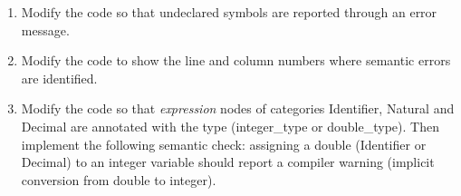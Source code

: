 \begin{enumerate}
\item Modify the code so that undeclared symbols are reported through an error message.
\item Modify the code to show the line and column numbers where semantic errors are identified.
\item Modify the code so that \textit{expression} nodes of categories Identifier, Natural and Decimal are annotated with the type (integer\_type or double\_type). Then implement the following semantic check: assigning a double (Identifier or Decimal) to an integer variable should report a compiler warning (implicit conversion from double to integer).
\end{enumerate}